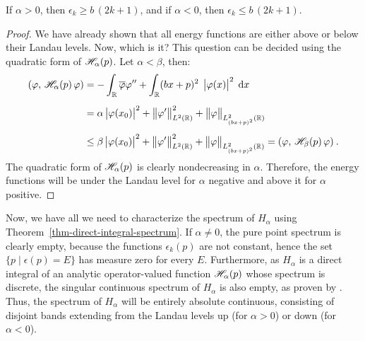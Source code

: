 \begin{claim}
    If $\alpha > 0$, then $\epsilon_k \geq b \, (2k+1)$, and if $\alpha < 0$, then $\epsilon_k \leq b \, (2k+1)$.
\end{claim}
\begin{proof}
    We have already shown that all energy functions are either above or below their Landau levels. Now, which is it? This question can be decided using the quadratic form of $\mathscr{H}_\alpha(p)$. Let $\alpha < \beta$, then:
    \begin{align*}
        (\varphi, \, \mathscr{H}_\alpha(p) \, \varphi)
        &= -\int_{\mathbb{R}} \overline{\varphi} \varphi''
        + \int_{\mathbb{R}} (b x + p)^2 \;\, \big|\varphi(x)\big|^2 \; \, \mathrm{d}x \,
        \\[5pt]
        &= \alpha \, \big|\varphi(x_0)\big|^2
        + \big\lVert \varphi' \big\rVert_{L^2(\mathbb{R})}^2
        + \big\lVert \varphi \big\rVert_{L^2_{(bx+p)^2}(\mathbb{R})}
        \\[5pt]
        &\leq \beta \, \big|\varphi(x_0)\big|^2
        + \big\lVert \varphi' \big\rVert_{L^2(\mathbb{R})}^2
        + \big\lVert \varphi \big\rVert_{L^2_{(bx+p)^2}(\mathbb{R})}
        =
        (\varphi, \, \mathscr{H}_\beta(p) \, \varphi)
        \: .
    \end{align*}
    The quadratic form of $\mathscr{H}_\alpha(p)$ is clearly nondecreasing in $\alpha$. Therefore, the energy functions will be under the Landau level for $\alpha$ negative and above it for $\alpha$ positive.
\end{proof}

Now, we have all we need to characterize the spectrum of $H_\alpha$ using Theorem~\ref{thm-direct-integral-spectrum}. If $\alpha \neq 0$, the pure point spectrum is clearly empty, because the functions $\epsilon_k(p)$ are not constant, hence the set $\{ p \; | \; \epsilon(p) = E \}$ has measure zero for every $E$. Furthermore, as $H_\alpha$ is a direct integral of an analytic operator-valued function $\mathscr{H}_\alpha(p)$ whose spectrum is discrete, the singular continuous spectrum of $H_\alpha$ is also empty, as proven by \cite{Filonov2006}. Thus, the spectrum of $H_\alpha$ will be entirely absolute continuous, consisting of disjoint bands extending from the Landau levels up (for $\alpha>0$) or down (for $\alpha<0$).


